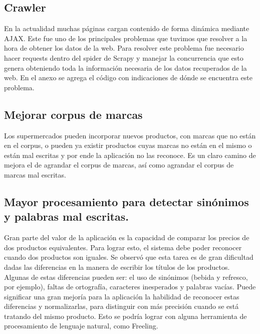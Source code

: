 \documentclass[12pt]{article} %
\begin{document}

\subsection{Crawler}

En la actualidad muchas páginas cargan contenido de forma dinámica mediante AJAX. Este fue uno de los principales problemas que tuvimos que resolver a la hora de obtener los datos de la web. Para resolver este problema fue necesario hacer requests dentro del spider de Scrapy y manejar la concurrencia que esto genera obteniendo toda la información necesaria de los datos recuperados de la web. En el anexo se agrega el código con indicaciones de dónde se encuentra este problema.


\subsection{Mejorar corpus de marcas}
Los supermercados pueden incorporar nuevos productos, con marcas que no están en el corpus, o pueden ya existir productos cuyas marcas no están en el mismo o están mal escritas y por ende la aplicación no las reconoce. Es un claro camino de mejora el de agrandar el corpus de marcas, así como agrandar el corpus de marcas mal escritas.


\subsection{Mayor procesamiento para detectar sinónimos y palabras mal escritas.}
Gran parte del valor de la aplicación es la capacidad de comparar los precios de dos productos equivalentes. Para lograr esto, el sistema debe poder reconocer cuando dos productos son iguales. Se observó que esta tarea es de gran dificultad dadas las diferencias en la manera de escribir los títulos de los productos. Algunas de estas diferencias pueden ser: el uso de sinónimos (bebida y refresco, por ejemplo), faltas de ortografía, caracteres inesperados y palabras vacías. Puede significar una gran mejoría para la aplicación la habilidad de reconocer estas diferencias y normalizarlas, para distinguir con más precisión cuando se está tratando del mismo producto. Esto se podría lograr con alguna herramienta de procesamiento de lenguaje natural, como Freeling.
\end{document}
